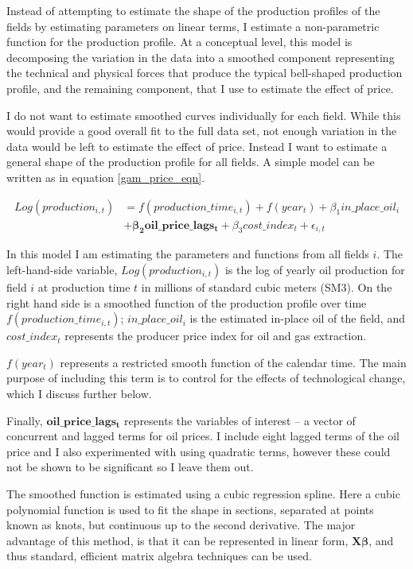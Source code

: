 \documentclass[12pt]{article}
\begin{document}
Instead of attempting to estimate the shape of the production profiles of the fields by estimating parameters on linear terms, I estimate a non-parametric function for the production profile. At a conceptual level, this model is decomposing the variation in the data into a smoothed component representing the technical and physical forces that produce the typical bell-shaped production profile, and the remaining component, that I use to estimate the effect of price.  

I do not want to estimate smoothed curves individually for each field. While this would provide a good overall fit to the full data set, not enough variation in the data would be left to estimate the effect of price.  Instead I want to estimate a general shape of the production profile for all fields. A simple model can be written as in equation \ref{gam_price_eqn}. 

\begin{equation}
\begin{split}
	Log(production_{i,t}) & = f(production\_time_{i,t}) + f(year_t) + \beta_1 in\_place\_oil_{i}\\
	 \quad & + \mathbf{\beta_2 oil\_price\_lags_t} + 
	 \beta_3 cost\_index_{t}  +  
	  \epsilon_{i,t}
\label{gam_price_eqn}
\end{split}
\end{equation}

In this model I am estimating the parameters and functions from all fields $i$. The left-hand-side variable, $Log(production_{i,t})$ is the log of yearly oil production for field $i$ at production time $t$ in millions of standard cubic meters (SM3).  On the right hand side is a smoothed function of the production profile over time $f(production\_time_{i,t})$; $in\_place\_oil_{i}$ is the estimated in-place oil of the field, and $cost\_index_{t}$ represents the producer price index for oil and gas extraction. 

$f(year_t)$ represents a restricted smooth function of the calendar time.  The main purpose of including this term is to control for the effects of technological change, which I discuss further below.

Finally, $\mathbf{oil\_price\_lags_t}$ represents the variables of interest -- a vector of concurrent and lagged terms for oil prices. I include eight lagged terms of the oil price and I also experimented with using quadratic terms, however these could not be shown to be significant so I leave them out. 

The smoothed function is estimated using a cubic regression spline. Here a cubic polynomial function is used to fit the shape in sections, separated at points known as knots, but continuous up to the second derivative.  The major advantage of this method, is that it can be represented in linear form, $\boldsymbol{X \beta} $, and thus standard, efficient matrix algebra techniques can be used.  
\end{document}
